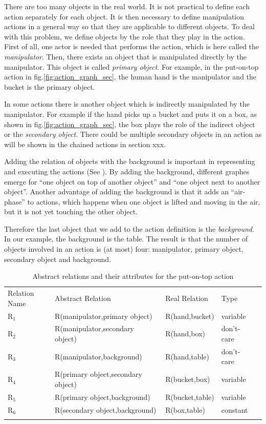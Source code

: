 There are too many objects in the real world.
It is not practical to define each action separately for each object.
It is then necessary to define manipulation actions in a general way so that they are applicable to different objects.
To deal with this problem, we define objects by the role that they play in the action.
First of all, one actor is needed that performs the action, which is here called the \textit{manipulator}.
Then, there exists an object that is manipulated directly by the manipulator.
This object is called \textit{primary object}.
For example, in the put-on-top action in fig.\ref{fig:action_graph_sec}, the human hand is the manipulator and the bucket is the primary object.

In some actions there is another object which is indirectly manipulated by the manipulator.
For example if the hand picks up a bucket and puts it on a box, as shown in fig.\ref{fig:action_graph_sec},
the box plays the role of the indirect object or the \textit{secondary object}.
There could be multiple secondary objects in an action as will be shown in the chained actions in section xxx.

Adding the relation of objects with the background is important in representing and executing the actions (See \cite{TAMD13}).
By adding the background, different graphes emerge for ``one object on top of another object'' and ``one object next to another object''.
Another advantage of adding the background is that it adds an ``air-phase'' to actions,
which happens when one object is lifted and moving in the air, but it is not yet touching the other object.

Therefore the last object that we add to the action definition is the \textit{background}.
In our example, the background is the table.
The result is that the number of objects involved in an action is (at most) four: manipulator, primary object, secondary object and background.

\begin{table}
\centering
\caption{Abstract relations and their attributes for the put-on-top action}
\begin{tabular}{ lllll }
\hline\noalign{\smallskip}
Relation Name & Abstract Relation & Real Relation & Type \\
\noalign{\smallskip}\hline\noalign{\smallskip}
$\text{R}_1$  & R(manipulator,primary object) & R(hand,bucket) & variable \\
$\text{R}_2$  & R(manipulator,secondary object)& R(hand,box) & don't-care \\
$\text{R}_3$  & R(manipulator,background) & R(hand,table) & don't-care \\
$\text{R}_4$  & R(primary object,secondary object) & R(bucket,box) & variable  \\
$\text{R}_5$  & R(primary object,background) & R(bucket,table) & variable \\
$\text{R}_6$  & R(secondary object,background)& R(box,table) & constant \\
\noalign{\smallskip}\hline
\end{tabular}
\label{tab:relations}
\end{table}

